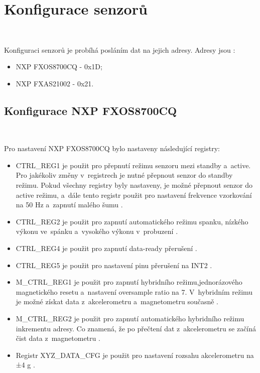\section{Konfigurace senzorů}\

Konfiguraci senzorů je probíhá posláním dat na jejich adresy. Adresy jsou \cite{frdmk66UserGuide}:
\begin{itemize}
    \item NXP FXOS8700CQ - 0x1D;
    \item NXP FXAS21002 - 0x21.
\end{itemize}

\subsection{Konfigurace NXP FXOS8700CQ}\

Pro nastavení NXP FXOS8700CQ bylo nastaveny následující registry: 

\begin{itemize}
    \item CTRL\_REG1 je použit pro přepnutí režimu senzoru mezi standby a~active.
    Pro jakékoliv změny v~registrech je nutné přepnout senzor do standby režimu.
    Pokud všechny registry byly nastaveny, je možné přepnout senzor do active
    režimu, a~dále tento registr použit pro nastavení frekvence vzorkování na 50 Hz
    a~zapnutí malého šumu \cite{FXOS8700CQ}.

    \item CTRL\_REG2 je použit pro zapnutí automatického režimu spanku, nízkého
    výkonu ve~spánku a~vysokého výkonu v~probuzení \cite{FXOS8700CQ}.

    \item CTRL\_REG4 je použit pro zapnutí data-ready přerušení \cite{FXOS8700CQ}.

    \item CTRL\_REG5 je použit pro nastavení pinu přerušení na INT2 \cite{FXOS8700CQ}.

    \item M\_CTRL\_REG1 je použit pro zapnutí hybridního režimu,jednorázového
    magnetického resetu a~nastavení oversample ratio na 7. V~hybridním režimu je
    možné získat data z~akcelerometru a~magnetometru současně \cite{FXOS8700CQ}.

    \item M\_CTRL\_REG2 je použit pro zapnutí automatického hybridního režimu
    inkrementu adresy. Co znamená, že po přečtení dat z~akcelerometru se začíná čist
    data z~magnetometru \cite{FXOS8700CQ}.

    \item Registr XYZ\_DATA\_CFG je použit pro nastavení rozsahu akcelerometru na ±4
    g \cite{FXOS8700CQ}.
\end{itemize}


